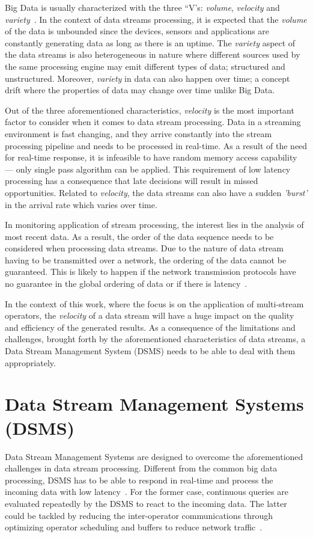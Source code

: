 Big Data is usually characterized with the three “V's: \emph{volume}, \emph{velocity} 
and \emph{variety}~\cite{big_data_analytics}. 
In the context of data streams processing, it is expected that the \emph{volume} of 
the data is unbounded since the devices, sensors and applications are constantly 
generating data as long as there is an uptime. The \emph{variety} aspect of the 
data streams is also heterogeneous in nature where different sources used by the same 
processing engine may emit different types of data; structured and unstructured. 
Moreover, \emph{variety} in data can also happen over time; a concept drift where 
the properties of data may change over time unlike Big Data. 

Out of the three aforementioned characteristics, \emph{velocity} is the most important 
factor to consider when it comes to data stream processing. Data in a streaming 
environment is fast changing, and they arrive constantly into the stream processing
pipeline and needs to be processed in real-time. As a result of the need for real-time 
response, it is infeasible to have random memory access capability --- only single pass algorithm can
be applied. This requirement of low latency processing has a consequence 
that late decisions will result in missed opportunities. Related to \emph{velocity}, 
the data streams can also have a sudden \emph{'burst'} in the arrival rate which varies 
over time. 

In monitoring application of stream processing, the interest lies in the analysis of 
most recent data. As a result, the order of the data sequence needs to be considered 
when processing data streams. Due to the nature of data stream having to be transmitted over a 
network, the ordering of the data cannot be guaranteed. This is 
likely to happen if the network transmission protocols have no guarantee in the global 
ordering of data or if there is latency~\cite{requirements_dsp}. 

In the context of this work, where the focus is on the application of multi-stream operators, 
the \emph{velocity} of a data stream will have a huge impact on the quality and efficiency of 
the generated results. As a consequence of the limitations and challenges, brought forth by the 
aforementioned characteristics of data streams, a Data Stream Management System (DSMS) needs 
to be able to deal with them appropriately.  

\section{Data Stream Management Systems (DSMS)} 
Data Stream Management Systems are designed to overcome the aforementioned challenges 
in data stream processing. Different from the common big data processing, DSMS has to be 
able to respond in real-time and process the incoming data with low latency~\cite{data_stream_management}. 
For the former case, continuous queries are evaluated repeatedly by the DSMS to react 
to the incoming data. The latter could be tackled by reducing the inter-operator communications 
through optimizing operator scheduling and buffers to reduce network traffic~\cite{low_latency_data_stream}. 



